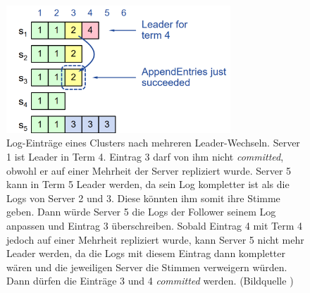 \begin{figure}[H]
	\centering
	\includegraphics[width=0.75\textwidth]{img/commit-restriction.png}
	\caption{Log-Einträge eines Clusters nach mehreren Leader-Wechseln. Server 1 ist Leader in Term 4. Eintrag 3 darf von ihm nicht \textit{committed}, obwohl er auf einer Mehrheit der Server repliziert wurde. Server 5 kann in Term 5 Leader werden, da sein Log \glqq{}kompletter\grqq{} ist als die Logs von Server 2 und 3. Diese könnten ihm somit ihre Stimme geben. Dann würde Server 5 die Logs der Follower seinem Log anpassen und Eintrag 3 überschreiben. Sobald Eintrag 4 mit Term 4 jedoch auf einer Mehrheit repliziert wurde, kann Server 5 nicht mehr Leader werden, da die Logs mit diesem Eintrag dann \glqq{}kompletter\grqq{} wären und die jeweiligen Server die Stimmen verweigern würden. Dann dürfen die Einträge 3 und 4 \textit{committed} werden. (Bildquelle \cite{raft-user-study})}
	\label{fig:commit-restriction}
\end{figure}